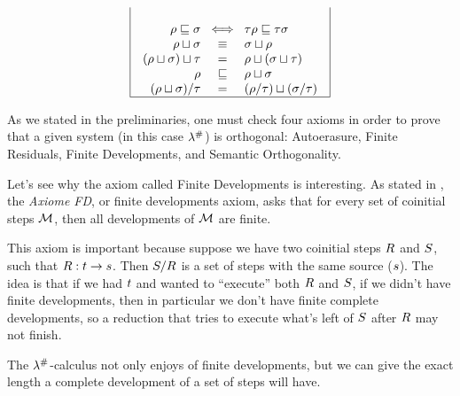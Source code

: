{\[\begin{array}{|c|c|c|}
\begin{array}{r@{\hspace{0.2cm}}c@{\hspace{0.2cm}}l}
\\
  \redseq \permle \redseqtwo & \iff & \redseqthree\redseq \permle \redseqthree\redseqtwo
\\
  \redseq \sqcup \redseqtwo  & \permeq & \redseqtwo \sqcup \redseq
\\
  (\redseq \sqcup \redseqtwo) \sqcup \redseqthree & = & \redseq \sqcup (\redseqtwo \sqcup \redseqthree)
\\
  \redseq & \permle & \redseq \sqcup \redseqtwo
\\
  (\redseq \sqcup \redseqtwo)/\redseqthree & = & (\redseq/\redseqthree) \sqcup (\redseqtwo/\redseqthree) \\
\end{array}
\\
\hline
\end{array}
\]
}

As we stated in the preliminaries, one must check four axioms in order to prove that
a given system (in this case $\lambda^{\mathtt{\#}}$) is orthogonal:
Autoerasure, Finite Residuals, Finite Developments, and Semantic Orthogonality.

Let's see why the axiom called Finite Developments is interesting.
As stated in \cite{thesismellies}, the \emph{Axiome FD}, or finite developments axiom,
asks that for every set of coinitial steps $\mathcal{M}$, then all developments of $\mathcal{M}$
are finite.

This axiom is important because suppose we have two coinitial steps $R$ and $S$,
such that $R : t \to s$. Then $S / R$ is a set of steps with
the same source ($s$). The idea is that if we had $t$ and wanted to ``execute'' both
$R$ and $S$, if we didn't have finite developments, then in particular
we don't have finite complete developments, so a reduction that tries to
execute what's left of $S$ after $R$ may not finish.

The $\lambda^{\mathtt{\#}}$-calculus not only enjoys of finite developments, but we can
give the exact length a complete development of a set of steps will have.

